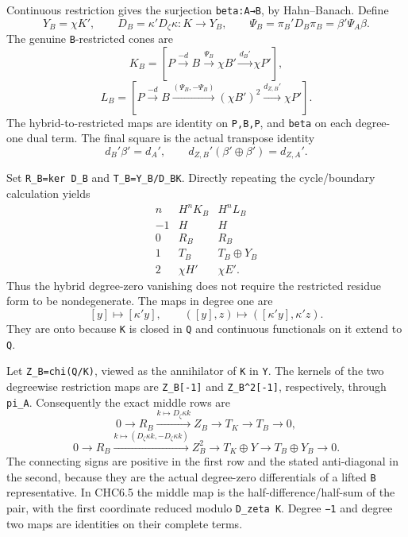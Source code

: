 Continuous restriction gives the surjection
\texttt{beta\textquotesingle{}:A\textquotesingle{}→B\textquotesingle{}},
by Hahn--Banach. Define \[
Y_B=\chi K',\qquad
D_B=\kappa'D_\zeta\kappa:K\to Y_B,
\qquad
\Psi_B=\pi_B'D_B\pi_B=\beta'\Psi_A\beta.
\] The genuine \texttt{B}-restricted cones are \[
K_B=[P\xrightarrow{-d}B\xrightarrow{\Psi_B}\chi B'
\xrightarrow{d_B'}\chi P'],
\] \[
L_B=[P\xrightarrow{-d}B\xrightarrow{(\Psi_B,-\Psi_B)}(\chi B')^2
\xrightarrow{d_{Z,B}'}\chi P'].
\tag{CHC6.1}
\] The hybrid-to-restricted maps are identity on
\texttt{P,B,P\textquotesingle{}}, and \texttt{beta\textquotesingle{}} on
each degree-one dual term. The final square is the actual transpose
identity \[
d_B'\beta'=d_A',\qquad
d_{Z,B}'(\beta'\oplus\beta')=d_{Z,A}'.
\]

Set \texttt{R\_B=ker\ D\_B} and \texttt{T\_B=Y\_B/D\_BK}. Directly
repeating the cycle/boundary calculation yields \[
\begin{array}{c|cc}
n&H^nK_B&H^nL_B\\\hline
-1&H&H\\
0&R_B&R_B\\
1&T_B&T_B\oplus Y_B\\
2&\chi H'&\chi E'.
\end{array}
\tag{CHC6.2}
\] Thus the hybrid degree-zero vanishing does not require the restricted
residue form to be nondegenerate. The maps in degree one are \[
[y]\longmapsto[\kappa'y],\qquad
([y],z)\longmapsto([\kappa'y],\kappa'z).
\tag{CHC6.3}
\] They are onto because \texttt{K} is closed in \texttt{Q} and
continuous functionals on it extend to \texttt{Q}.

Let \texttt{Z\_B=chi(Q/K)\textquotesingle{}}, viewed as the annihilator
of \texttt{K} in \texttt{Y}. The kernels of the two degreewise
restriction maps are \texttt{Z\_B{[}-1{]}} and
\texttt{Z\_B\^{}2{[}-1{]}}, respectively, through
\texttt{pi\_A\textquotesingle{}}. Consequently the exact middle rows are
\[
0\to R_B\xrightarrow{k\mapsto D_\zeta\kappa k}Z_B
\to T_K\to T_B\to0,
\tag{CHC6.4}
\] \[
0\to R_B\xrightarrow{k\mapsto(D_\zeta\kappa k,-D_\zeta\kappa k)}Z_B^2
\to T_K\oplus Y\to T_B\oplus Y_B\to0.
\tag{CHC6.5}
\] The connecting signs are positive in the first row and the stated
anti-diagonal in the second, because they are the actual degree-zero
differentials of a lifted \texttt{B} representative. In CHC6.5 the
middle map is the half-difference/half-sum of the pair, with the first
coordinate reduced modulo \texttt{D\_zeta\ K}. Degree \texttt{−1} and
degree two maps are identities on their complete terms.

